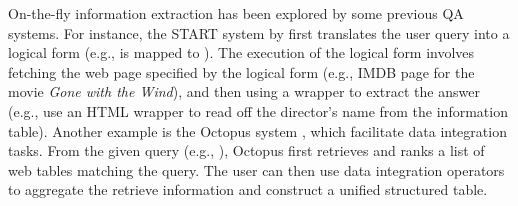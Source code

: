 On-the-fly information extraction
has been explored by some previous QA systems.
For instance, the START system by \citet{katz2002omnibase}
first translates the user query into a logical form
(e.g., 
is mapped to
).
The execution of the logical form involves
fetching the web page specified by the logical form
(e.g., IMDB page for the movie \emph{Gone with the Wind}),
and then using a wrapper to extract the answer
(e.g., use an HTML wrapper to read off the director's name
from the information table).
Another example is the Octopus system \cite{cafarella2009data},
which facilitate data integration tasks.
From the given query (e.g., ),
Octopus first retrieves and ranks a list of web tables matching the query.
The user can then use
data integration operators to aggregate
the retrieve information and construct a unified structured table.

